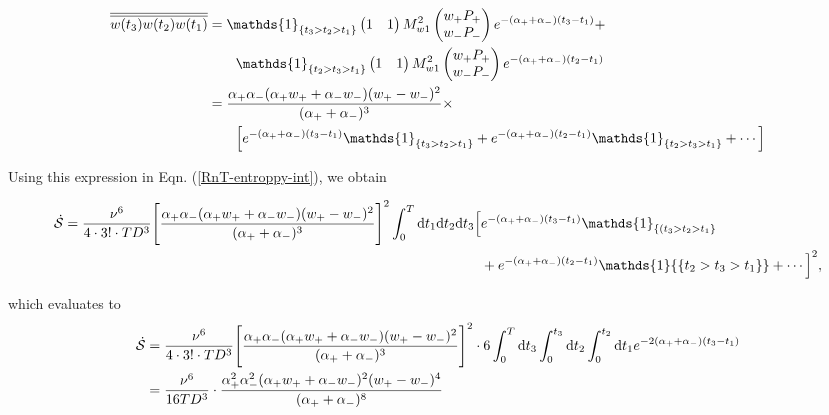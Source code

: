 \begin{equation}
\begin{split}
        \Overline{w(t_3)w(t_2)w(t_1)} &= \mathds{1}_{\{t_3>t_2>t_1\}}
 \begin{pmatrix}
1 & 1\\
\end{pmatrix}
M_{w1}^2
\begin{pmatrix}
w_+P_{+}\\
w_-P_{-}
\end{pmatrix} e^{-(\alpha_+ + \alpha_-)(t_3-t_1)} +  \\ &\quad \quad \mathds{1}_{\{t_2>t_3>t_1\}}
 \begin{pmatrix}
1 & 1\\
\end{pmatrix}
M_{w1}^2
\begin{pmatrix}
w_+P_{+}\\
w_-P_{-}
\end{pmatrix} e^{-(\alpha_+ + \alpha_-)(t_2-t_1)}\\
&= \frac{\alpha_+ \alpha_- (\alpha_+ w_+ + \alpha_- w_-)(w_+ - w_-)^2}{(\alpha_+ + \alpha_-)^3}\times \\ &\quad \quad \Big[ e^{-(\alpha_+ + \alpha_-)(t_3-t_1)}\mathds{1}_{\{t_3>t_2>t_1\}} + e^{-(\alpha_+ + \alpha_-)(t_2-t_1)}\mathds{1}_{\{t_2>t_3>t_1\}} + \cdots \Big]
\end{split}
\end{equation}

Using this expression in Eqn. (\ref{RnT-entroppy-int}), we obtain

\begin{align}
    \begin{split}
     \dot{\mathcal{S}}=  \frac{\nu^6}{4\cdot3!\cdot T D^3}\Bigg[\frac{\alpha_+ \alpha_- (\alpha_+ w_+ + \alpha_- w_-)(w_+ - w_-)^2}{(\alpha_+ + \alpha_-)^3}\Bigg]^2 \int_0^T\rmd t_1\rmd t_2\rmd t_3\Big[ & e^{-(\alpha_+ + \alpha_-)(t_3-t_1)}\mathds{1}_{\{(t_3>t_2>t_1\}} \\&+ e^{-(\alpha_+ + \alpha_-)(t_2-t_1)}\mathds{1}{\{t_2>t_3>t_1\}} + \cdots \Big]^2,
\end{split}
\end{align}

which evaluates to
\begin{align}
    \begin{split}
 \dot{\mathcal{S}}&=  \frac{\nu^6}{4\cdot3!\cdot T D^3}\Bigg[\frac{\alpha_+ \alpha_- (\alpha_+ w_+ + \alpha_- w_-)(w_+ - w_-)^2}{(\alpha_+ + \alpha_-)^3}\Bigg]^2\cdot 6 \int_0^T\mathrm{d} t_3\int_0^{t_3}\mathrm{d} t_2\int_0^{t_2}\mathrm{d} t_1  e^{-2(\alpha_+ + \alpha_-)(t_3-t_1)}\\
 &=\frac{\nu^6}{16 T D^3}\cdot \frac{\alpha_+^2 \alpha_-^2 (\alpha_+ w_+ + \alpha_- w_-)^2(w_+ - w_-)^4}{(\alpha_+ + \alpha_-)^8}
\end{split}
\end{align}

